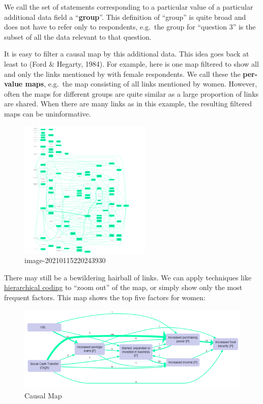 \documentclass[
]{book}
\begin{document}
We call the set of statements corresponding to a particular value of a particular additional data field a ``\textbf{group}''. This definition of ``group'' is quite broad and does not have to refer only to respondents, e.g.~the group for ``question 3'' is the subset of all the data relevant to that question.

It is easy to filter a causal map by this additional data. This idea goes back at least to (Ford \& Hegarty, 1984). For example, here is one map filtered to show all and only the links mentioned by with female respondents. We call these the \textbf{per-value maps}, e.g.~the map consisting of all links mentioned by women. However, often the maps for different groups are quite similar as a large proportion of links are shared. When there are many links as in this example, the resulting filtered maps can be uninformative.

\begin{figure}
\centering
\includegraphics{_assets/image-20210115220243930.png}
\caption{image-20210115220243930}
\end{figure}

There may still be a bewildering hairball of links. We can apply techniques like \href{https://causalmapdocumentation.blot.im/simplifying-causal-maps-with-hierarchical-coding}{hierarchical coding} to ``zoom out'' of the map, or simply show only the most frequent factors. This map shows the top five factors for women:

\begin{figure}
\centering
\includegraphics{_assets/women.png}
\caption{Causal Map}
\end{figure}
\end{document}
